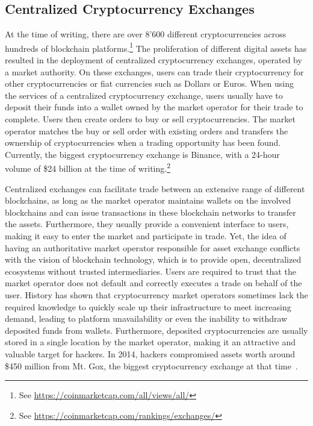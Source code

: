 \subsection{Centralized Cryptocurrency Exchanges}
At the time of writing, there are over 8'600 different cryptocurrencies across hundreds of blockchain platforms.\footnote{See \url{https://coinmarketcap.com/all/views/all/}}
The proliferation of different digital assets has resulted in the deployment of centralized cryptocurrency exchanges, operated by a market authority.
On these exchanges, users can trade their cryptocurrency for other cryptocurrencies or fiat currencies such as Dollars or Euros.
When using the services of a centralized cryptocurrency exchange, users usually have to deposit their funds into a wallet owned by the market operator for their trade to complete.
Users then create orders to buy or sell cryptocurrencies.
The market operator matches the buy or sell order with existing orders and transfers the ownership of cryptocurrencies when a trading opportunity has been found.
Currently, the biggest cryptocurrency exchange is Binance, with a 24-hour volume of \$24 billion at the time of writing.\footnote{See \url{https://coinmarketcap.com/rankings/exchanges/}}

Centralized exchanges can facilitate trade between an extensive range of different blockchains, as long as the market operator maintains wallets on the involved blockchains and can issue transactions in these blockchain networks to transfer the assets.
Furthermore, they usually provide a convenient interface to users, making it easy to enter the market and participate in trade.
Yet, the idea of having an authoritative market operator responsible for asset exchange conflicts with the vision of blockchain technology, which is to provide open, decentralized ecosystems without trusted intermediaries.
Users are required to trust that the market operator does not default and correctly executes a trade on behalf of the user.
History has shown that cryptocurrency market operators sometimes lack the required knowledge to quickly scale up their infrastructure to meet increasing demand, leading to platform unavailability or even the inability to withdraw deposited funds from wallets.
Furthermore, deposited cryptocurrencies are usually stored in a single location by the market operator, making it an attractive and valuable target for hackers.
In 2014, hackers compromised assets worth around \$450 million from Mt. Gox, the biggest cryptocurrency exchange at that time~\cite{trautman2014virtual}.

